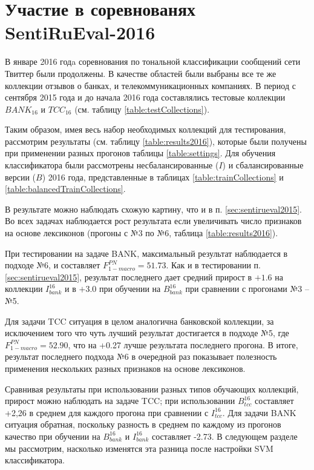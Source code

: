 \section{Участие в соревнованях SentiRuEval-2016}
\label{sec:sentirueval2016}

В январе 2016 годa соревнования по тональной классификации сообщений
сети Твиттер были продолжены.
В качестве областей были выбраны все те же коллекции отзывов о банках,
и телекоммуникационных компаниях. В период с сентября 2015 года и до начала
2016 года составлялись тестовые коллекции $BANK_{16}$ и $TCC_{16}$ (см.
таблицу \ref{table:testCollections}).

Таким образом, имея весь набор необходимых коллекций для тестирования, рассмотрим
результаты (см. таблицу \ref{table:results2016}), которые были получены при
применении разных прогонов таблицы \ref{table:settings}.
Для обучения классификатора были рассмотрены несбалансированные ($I$)
и сбалансированные версии ($B$) 2016 года, представленные в таблицах
\ref{table:trainCollections} и \ref{table:balancedTrainCollections}.



В результате можно наблюдать схожую картину, что и в п. \ref{sec:sentirueval2015}.
Во всех задачах наблюдается рост результата если увеличивать число признаков
на основе лексиконов (прогоны с №3 по №6, таблица \ref{table:results2016}).


При тестировании на задаче BANK, максимальный результат наблюдается
в подходе №6, и составляет $F_{1-macro}^{PN} = 51.73$.
Как и в тестировании п. \ref{sec:sentirueval2015}, результат последнего
дает средний прирост в $+1.6$ на коллекции $I_{bank}^{16}$ и в $+3.0$
при обучении на $B_{bank}^{16}$ при сравнении с прогонами №3 -- №5.

Для задачи TCC ситуация в целом аналогична банковской коллекции, за исключением
того что чуть лучший результат достигается в подходе №5, где
$F_{1-macro}^{PN} = 52.90$,
что на +0.27 лучше результата последнего прогона.
В итоге, результат последнего подхода №6 в очередной раз показывает полезность
применения нескольких разных признаков на основе лексиконов.

Сравнивая результаты при использовании разных типов обучающих коллекций,
прирост можно наблюдать на задаче TCC; при использовании $B_{tcc}^{16}$
составляет +2,26 в среднем для каждого прогона при сравнении с $I_{tcc}^{16}$.
Для задачи BANK ситуация обратная, поскольку разность в среднем по каждому
из прогонов качество при обучении на $B_{bank}^{16}$  и $I_{bank}^{16}$
составляет -2.73.
В следующем разделе мы рассмотрим, насколько изменятся эта разница после
настройки SVM классификатора.

